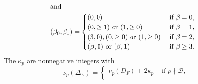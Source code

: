 \begin{theorem}
\begin{align*}
\intertext{and}
(\beta_0, \beta_1) &=
\begin{cases}
(0, 0) 
    & \mbox{ if } \beta =0, \\
(0, \geq 1) \mbox{ or } (1, \geq 0) 
    & \mbox{ if } \beta =1, \\
(3,0), (0, \geq 0) \mbox{ or } (1, \geq 0) 
    & \mbox{ if } \beta =2, \\
(\beta, 0) \mbox{ or } (\beta,1) 
    & \mbox{ if } \beta \geq 3.
\end{cases}
\end{align*}
The  $\kappa_p$ are nonnegative integers with
\begin{equation} \label{term0}
\nu_p (\Delta_E)  =
\left\{
\begin{array}{lc}
 \nu_p (D_F) + 2 \kappa_p & \mbox{ if }  p \nmid \mathcal{D}, \\

\end{array}
\end{equation}
\end{theorem}

